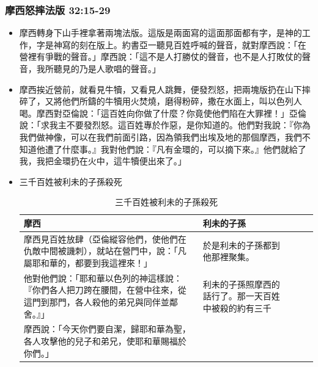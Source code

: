 \begin{table}
\subsubsection{摩西怒摔法版 32:15-29}
\begin{itemize}
\itemsep-.35em
\item 摩西轉身下山手裡拿著兩塊法版。這版是兩面寫的這面那面都有字，是神的工作，字是神寫的刻在版上。約書亞一聽見百姓呼喊的聲音，就對摩西說：「在營裡有爭戰的聲音。」摩西說：「這不是人打勝仗的聲音，也不是人打敗仗的聲音，我所聽見的乃是人歌唱的聲音。」
\item 摩西挨近營前，就看見牛犢，又看見人跳舞，便發烈怒，把兩塊版扔在山下摔碎了，又將他們所鑄的牛犢用火焚燒，磨得粉碎，撒在水面上，叫以色列人喝。摩西對亞倫說：「這百姓向你做了什麼？你竟使他們陷在大罪裡！」亞倫說：「求我主不要發烈怒。這百姓專於作惡，是你知道的。他們對我說：『你為我們做神像，可以在我們前面引路，因為領我們出埃及地的那個摩西，我們不知道他遭了什麼事。』我對他們說：『凡有金環的，可以摘下來。』他們就給了我，我把金環扔在火中，這牛犢便出來了。」
\item 三千百姓被利未的子孫殺死
\begin{table}[H]
\begin{threeparttable}
\begin{tabular}{@{}p{}*{4}{L{\tabcolsep\relax}}@{}}
\toprule
摩西 & 利未的子孫 \\\hline
摩西見百姓放肆（亞倫縱容他們，使他們在仇敵中間被譏刺），就站在營門中，說：「凡屬耶和華的，都要到我這裡來！」&於是利未的子孫都到他那裡聚集。\tabularnewline\hline
他對他們說：「耶和華以色列的神這樣說：『你們各人把刀跨在腰間，在營中往來，從這門到那門，各人殺他的弟兄與同伴並鄰舍。』」 &利未的子孫照摩西的話行了。那一天百姓中被殺的約有三千\tabularnewline\hline
摩西說：「今天你們要自潔，歸耶和華為聖，各人攻擊他的兒子和弟兄，使耶和華賜福於你們。」 &\tabularnewline
\bottomrule
\end{tabular}
\caption{三千百姓被利未的子孫殺死}
\end{threeparttable}
\end{table} 
\end{itemize}


\end{table}
